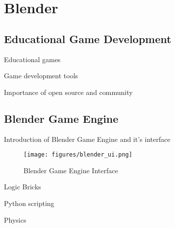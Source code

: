 \chapter{Blender}

\section{Educational Game Development}
Educational games


Game development tools


Importance of open source and community


\section{Blender Game Engine}
Introduction of Blender Game Engine and it's interface

\begin{figure}[!htc]
 		\centering
		\texttt{[image: figures/blender\_ui.png]}
		\label{fig:logic}
        \caption{ Blender Game Engine Interface }
\end{figure}

Logic Bricks


Python scripting


Physics





